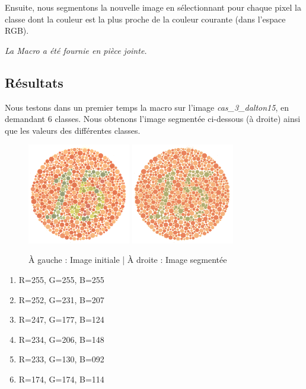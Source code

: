 \documentclass[a4paper]{article}
\begin{document}
Ensuite, nous segmentons la nouvelle image en sélectionnant pour chaque pixel la classe dont la couleur est la plus proche de la couleur courante (dans l'espace RGB).

{\em La Macro a été fournie en pièce jointe.}

\subsection{Résultats}
Nous testons dans un premier temps la macro sur l'image {\em cas\_3\_dalton15}, en demandant 6 classes. Nous obtenons l'image segmentée ci-dessous (à droite) ainsi que les valeurs des différentes classes.

\begin{figure}[H]
\begin{center}
\includegraphics[width=170px]{../base/cas_3_dalton15.png}
\includegraphics[width=170px]{../resultats/cas_3_dalton15.png}
\end{center}
\caption{À gauche : Image initiale | À droite : Image segmentée}
\end{figure}

\begin{enumerate}
  \item R=255, G=255, B=255
  \item R=252, G=231, B=207
  \item R=247, G=177, B=124
  \item R=234, G=206, B=148
  \item R=233, G=130, B=092
  \item R=174, G=174, B=114
\end{enumerate}
\end{document}
